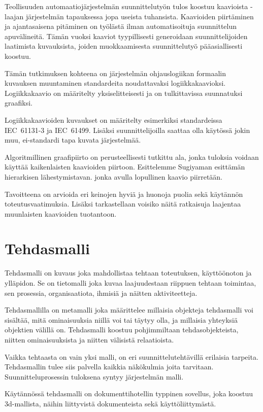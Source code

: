 \documentclass[finnish,12pt]{article}
\begin{document}
Teollisuuden automaatiojärjestelmän suunnittelutyön tulos koostuu kaavioista - laajan järjestelmän tapauksessa jopa useista tuhansista. 
Kaavioiden piirtäminen ja ajantasaisena pitäminen on työlästä ilman automatisoituja suunnittelun apuvälineitä.
Tämän vuoksi kaaviot tyypillisesti generoidaan suunnittelijoiden laatimista kuvauksista, joiden muokkaamisesta suunnittelutyö pääasiallisesti koostuu.

Tämän tutkimuksen kohteena on järjestelmän ohjauslogiikan formaalin kuvauksen muuntaminen standardeita noudattavaksi logiikkakaavioksi.
Logiikkakaavio on määritelty yksiselitteisesti ja on tulkittavissa suunnatuksi graafiksi.

Logiikkakaavioiden kuvaukset on määritelty esimerkiksi standardeissa IEC~61131-3 ja IEC~61499.
Lisäksi suunnittelijoilla saattaa olla käytössä jokin muu, ei-standardi tapa kuvata järjestelmää.

Algoritmillinen graafipiirto on perusteellisesti tutkittu ala, jonka tuloksia voidaan käyttää kaikenlaisten kaavioiden piirtoon.
Esittelemme Sugiyaman esittämän hierarkisen lähestymistavan. jonka avulla lopullinen kaavio piirretään.

Tavoitteena on arvioida eri keinojen hyviä ja huonoja puolia sekä käytännön toteutusvaatimuksia.
Lisäksi tarkastellaan voisiko näitä ratkaisuja laajentaa muunlaisten kaavioiden tuotantoon.

	\clearpage
	\section{Tehdasmalli}

Tehdasmalli on kuvaus joka mahdollistaa tehtaan toteutuksen, käyttöönoton ja ylläpidon.
Se on tietomalli joka kuvaa laajuudestaan riippuen tehtaan toimintaa, sen prosessia, organisaatiota, ihmisiä ja näitten aktiviteetteja.

Tehdasmallilla on metamalli joka määrittelee millaisia objekteja tehdasmalli voi sisältää, mitä ominaisuuksia niillä voi tai täytyy olla, ja millaisia yhteyksiä objektien välillä on.
Tehdasmalli koostuu pohjimmiltaan tehdasobjekteista, niitten ominaisuuksista ja niitten välisistä relaatioista. 

Vaikka tehtaasta on vain yksi malli, on eri suunnittelutehtävillä erilaisia tarpeita.
Tehdasmallin tulee siis palvella kaikkia näkökulmia joita tarvitaan.  
Suunnitteluprosessin tuloksena syntyy järjestelmän malli.

Käytännössä tehdasmalli on dokumenttihotellin typpinen sovellus, joka koostuu 3d-mallista, näihin liittyvistä dokumenteista sekä käyttöliittymästä.
\end{document}
